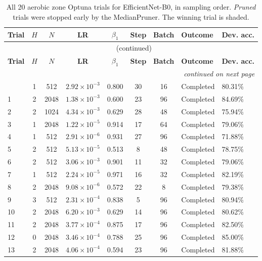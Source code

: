 {\footnotesize
\begin{longtable}{lccccccll}
\caption{All 20 aerobic zone Optuna trials for EfficientNet-B0, in sampling order. \emph{Pruned} trials were stopped early by the MedianPruner. The winning trial is shaded.}
\label{tab:trials_aerobic_efficientnet_b0} \\
\toprule
\textbf{Trial} & \textbf{$H$} & \textbf{$N$} & \textbf{LR} & \textbf{$\beta_1$} & \textbf{Step} & \textbf{Batch} & \textbf{Outcome} & \textbf{Dev. acc.} \\
\midrule
\endfirsthead
\multicolumn{9}{c}{\tablename\ \thetable{} (continued)} \\
\toprule
\textbf{Trial} & \textbf{$H$} & \textbf{$N$} & \textbf{LR} & \textbf{$\beta_1$} & \textbf{Step} & \textbf{Batch} & \textbf{Outcome} & \textbf{Dev. acc.} \\
\midrule
\endhead
\midrule
\multicolumn{9}{r}{\emph{continued on next page}} \\
\endfoot
\bottomrule
\endlastfoot
0 & 1 & 512 & $2.92\times10^{-3}$ & 0.800 & 30 & 16 & Completed & 80.31\% \\
1 & 2 & 2048 & $1.38\times10^{-3}$ & 0.600 & 23 & 96 & Completed & 84.69\% \\
2 & 2 & 1024 & $4.34\times10^{-3}$ & 0.629 & 28 & 48 & Completed & 75.94\% \\
3 & 1 & 2048 & $1.22\times10^{-5}$ & 0.914 & 17 & 64 & Completed & 79.06\% \\
4 & 1 & 512 & $2.91\times10^{-6}$ & 0.931 & 27 & 96 & Completed & 71.88\% \\
5 & 2 & 512 & $5.13\times10^{-5}$ & 0.513 & 8 & 48 & Completed & 78.75\% \\
6 & 2 & 512 & $3.06\times10^{-3}$ & 0.901 & 11 & 32 & Completed & 79.06\% \\
7 & 1 & 512 & $2.24\times10^{-5}$ & 0.971 & 16 & 32 & Completed & 82.19\% \\
8 & 2 & 2048 & $9.08\times10^{-6}$ & 0.572 & 22 & 8 & Completed & 79.38\% \\
9 & 3 & 512 & $2.31\times10^{-4}$ & 0.838 & 5 & 96 & Completed & 80.94\% \\
10 & 2 & 2048 & $6.20\times10^{-3}$ & 0.629 & 14 & 96 & Completed & 80.62\% \\
11 & 2 & 2048 & $3.77\times10^{-4}$ & 0.875 & 17 & 96 & Completed & 82.50\% \\
12 & 0 & 2048 & $3.46\times10^{-4}$ & 0.788 & 25 & 96 & Completed & 85.00\% \\
13 & 2 & 2048 & $4.06\times10^{-4}$ & 0.594 & 23 & 96 & Completed & 81.88\% \\

\end{longtable}}
